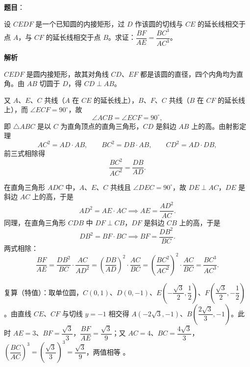 \begin{answer}

\textbf{题目}：

设 $CEDF$ 是一个已知圆的内接矩形，过 $D$ 作该圆的切线与 $CE$ 的延长线相交于点 $A$，与 $CF$ 的延长线相交于点 $B$。求证：$\dfrac{BF}{AE}=\dfrac{BC^3}{AC^3}$。
\nopagebreak[4]
\begin{center}\end{center}
\nopagebreak[4]
\textbf{解析}
\nopagebreak[4]
\begin{center}\end{center}
\nopagebreak[4]
$CEDF$ 是圆内接矩形，故其对角线 $CD$、$EF$ 都是该圆的直径，四个内角均为直角。由 $AB$ 切圆于 $D$，得 $CD\perp AB$。

又 $A$、$E$、$C$ 共线（$A$ 在 $CE$ 的延长线上），$B$、$F$、$C$ 共线（$B$ 在 $CF$ 的延长线上），而 $\angle ECF=90^\circ$，故
\nopagebreak[4]
\[
\angle ACB=\angle ECF=90^\circ,
\]
即 $\triangle ABC$ 是以 $C$ 为直角顶点的直角三角形，$CD$ 是斜边 $AB$ 上的高。由射影定理
\nopagebreak[4]
\[
AC^2=AD\cdot AB,\qquad BC^2=DB\cdot AB,\qquad CD^2=AD\cdot DB,
\]
前三式相除得
\nopagebreak[4]
\[
\frac{BC^2}{AC^2}=\frac{DB}{AD}.
\]

在直角三角形 $ADC$ 中，$A$、$E$、$C$ 共线且 $\angle DEC=90^\circ$，故 $DE\perp AC$，$DE$ 是斜边 $AC$ 上的高，于是
\nopagebreak[4]
\[
AD^2=AE\cdot AC\implies AE=\frac{AD^2}{AC}.
\]
同理，在直角三角形 $CDB$ 中 $DF\perp CB$，$DF$ 是斜边 $CB$ 上的高，于是
\nopagebreak[4]
\[
DB^2=BF\cdot BC\implies BF=\frac{DB^2}{BC}.
\]
两式相除：
\nopagebreak[4]
\[
\frac{BF}{AE}=\frac{DB^2}{BC}\cdot\frac{AC}{AD^2}
=\left(\frac{DB}{AD}\right)^2\cdot\frac{AC}{BC}
=\left(\frac{BC^2}{AC^2}\right)^2\cdot\frac{AC}{BC}
=\frac{BC^3}{AC^3}.
\]

复算（特值）：取单位圆，$C(0,1)$、$D(0,-1)$、$E\left(-\dfrac{\sqrt3}{2},\dfrac12\right)$、$F\left(\dfrac{\sqrt3}{2},-\dfrac12\right)$。由直线 $CE$、$CF$ 与切线 $y=-1$ 相交得 $A(-2\sqrt3,-1)$、$B\left(\dfrac{2\sqrt3}{3},-1\right)$。此时 $AE=3$、$BF=\dfrac{\sqrt3}{3}$，$\dfrac{BF}{AE}=\dfrac{\sqrt3}{9}$；又 $AC=4$、$BC=\dfrac{4\sqrt3}{3}$，$\left(\dfrac{BC}{AC}\right)^3=\left(\dfrac{\sqrt3}{3}\right)^3=\dfrac{\sqrt3}{9}$，两值相等 。


\end{answer}
